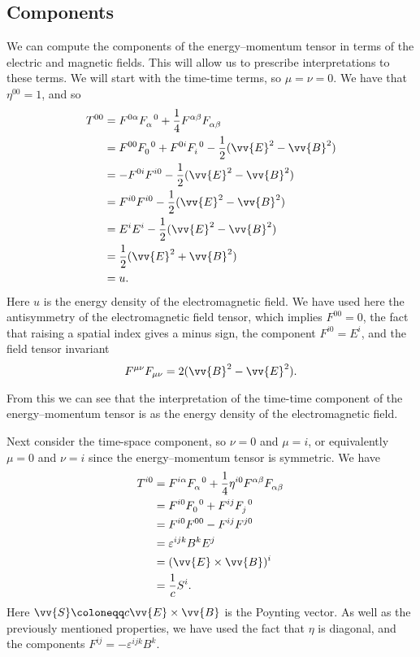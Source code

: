 \subsection{Components}
We can compute the components of the energy--momentum tensor in terms of the electric and magnetic fields.
This will allow us to prescribe interpretations to these terms.
We will start with the time-time terms, so \(\mu = \nu = 0\).
We have that \(\eta^{00} = 1\), and so
\begin{align}
    T^{00} &= \tensor{F}{^{0\alpha}}\tensor{F}{_\alpha^0} + \frac{1}{4} \tensor{F}{^{\alpha\beta}}\tensor{F}{_{\alpha\beta}}\\
    &= \tensor{F}{^{00}}\tensor{F}{_0^0} + \tensor{F}{^{0i}}\tensor{F}{_i^0} - \frac{1}{2}(\vv{E}^2 - \vv{B}^2)\\
    &= -\tensor{F}{^{0i}}\tensor{F}{^{i0}} - \frac{1}{2}(\vv{E}^2 - \vv{B}^2)\\
    &= \tensor{F}{^{i0}}\tensor{F}{^{i0}} - \frac{1}{2}(\vv{E}^2 - \vv{B}^2)\\
    &= E^iE^i - \frac{1}{2}(\vv{E}^2 - \vv{B}^2)\\
    &= \frac{1}{2}(\vv{E}^2 + \vv{B}^2)\\
    &= u.
\end{align}
Here \(u\) is the energy density of the electromagnetic field.
We have used here the antisymmetry of the electromagnetic field tensor, which implies \(F^{00} = 0\), the fact that raising a spatial index gives a minus sign, the component \(F^{i0} = E^i\), and the field tensor invariant
\begin{equation}
    F^{\mu\nu}F_{\mu\nu} = 2(\vv{B}^2 - \vv{E}^2).
\end{equation}

From this we can see that the interpretation of the time-time component of the energy--momentum tensor is as the energy density of the electromagnetic field.

Next consider the time-space component, so \(\nu = 0\) and \(\mu = i\), or equivalently \(\mu = 0\) and \(\nu = i\) since the energy--momentum tensor is symmetric.
We have
\begin{align}
    T^{i0} &= \tensor{F}{^{i\alpha}}\tensor{F}{_\alpha^0} + \frac{1}{4}\eta^{i0} \tensor{F}{^{\alpha\beta}}\tensor{F}{_{\alpha\beta}}\\
    &= \tensor{F}{^{i0}}\tensor{F}{_0^0} + \tensor{F}{^{ij}}\tensor{F}{_j^0}\\
    &= \tensor{F}{^{i0}}\tensor{F}{^{00}} - \tensor{F}{^{ij}}\tensor{F}{^{j0}}\\
    &= \varepsilon^{ijk}B^kE^j\\
    &= (\vv{E}\times\vv{B})^{i}\\
    &= \frac{1}{c}S^i.
\end{align}
Here \(\vv{S} \coloneqq c\vv{E}\times\vv{B}\) is the Poynting vector.
As well as the previously mentioned properties, we have used the fact that \(\eta\) is diagonal, and the components \(F^{ij} = -\varepsilon^{ijk}B^k\).

